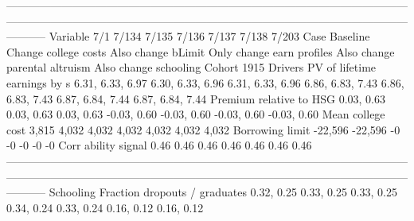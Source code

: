 -----------------------------------------------------------------------------------------------------------------------------------------------------------------------------------------------------------------------------------
                              Variable                         7/1                       7/134                    7/135                      7/136                          7/137                    7/138                    7/203
                                  Case                    Baseline        Change college costs       Also change bLimit  Only change earn profiles  Also change parental altruism    Also change schooling              Cohort 1915
                               Drivers                                                                                                                                                                                             
          PV of lifetime earnings by s            6.31, 6.33, 6.97            6.30, 6.33, 6.96         6.31, 6.33, 6.96           6.86, 6.83, 7.43               6.86, 6.83, 7.43         6.87, 6.84, 7.44         6.87, 6.84, 7.44
               Premium relative to HSG                  0.03, 0.63                  0.03, 0.63               0.03, 0.63                -0.03, 0.60                    -0.03, 0.60              -0.03, 0.60              -0.03, 0.60
                     Mean college cost                       3,815                       4,032                    4,032                      4,032                          4,032                    4,032                    4,032
                       Borrowing limit                     -22,596                     -22,596                       -0                         -0                             -0                       -0                       -0
                   Corr ability signal                        0.46                        0.46                     0.46                       0.46                           0.46                     0.46                     0.46
-----------------------------------------------------------------------------------------------------------------------------------------------------------------------------------------------------------------------------------
                             Schooling                                                                                                                                                                                             
         Fraction dropouts / graduates                  0.32, 0.25                  0.33, 0.25               0.33, 0.25                 0.34, 0.24                     0.33, 0.24               0.16, 0.12               0.16, 0.12
